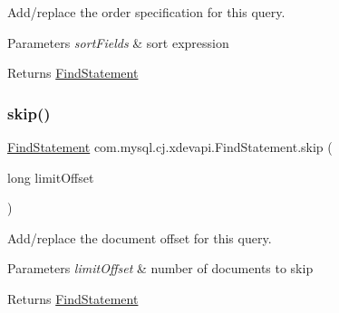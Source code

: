 Add/replace the order specification for this query.


\begin{DoxyParams}{Parameters}
{\em sort\+Fields} & sort expression \\
\hline
\end{DoxyParams}
\begin{DoxyReturn}{Returns}
\mbox{\hyperlink{interfacecom_1_1mysql_1_1cj_1_1xdevapi_1_1_find_statement}{Find\+Statement}} 
\end{DoxyReturn}
\mbox{\label{interfacecom_1_1mysql_1_1cj_1_1xdevapi_1_1_find_statement_a7bd11b1e008d429927ccf72c16f79d54}} 
\subsubsection{\texorpdfstring{skip()}{skip()}}
{\footnotesize\ttfamily \mbox{\hyperlink{interfacecom_1_1mysql_1_1cj_1_1xdevapi_1_1_find_statement}{Find\+Statement}} com.\+mysql.\+cj.\+xdevapi.\+Find\+Statement.\+skip (\begin{DoxyParamCaption}\item[{long}]{limit\+Offset }\end{DoxyParamCaption})}

Add/replace the document offset for this query.


\begin{DoxyParams}{Parameters}
{\em limit\+Offset} & number of documents to skip \\
\hline
\end{DoxyParams}
\begin{DoxyReturn}{Returns}
\mbox{\hyperlink{interfacecom_1_1mysql_1_1cj_1_1xdevapi_1_1_find_statement}{Find\+Statement}} 
\end{DoxyReturn}
\mbox{\label{interfacecom_1_1mysql_1_1cj_1_1xdevapi_1_1_find_statement_aa08256e0b22e4353c966b184e211c4a6}} 
